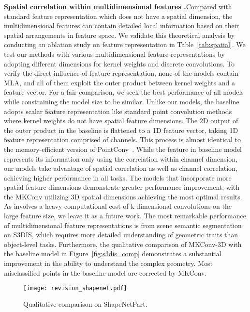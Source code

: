 \documentclass[preprint,12pt]{elsarticle}
\begin{document}
\medskip
\noindent\textbf{Spatial correlation within multidimensional features .}\hspace{0.3cm}Compared with standard feature representation which does not have a spatial dimension, the multidimensional features  can contain detailed local information based on their spatial arrangements in feature space. We validate this theoretical analysis by conducting an ablation study on feature representation in Table~\ref{tab:spatial}. We test our methods with various multidimensional feature representations by adopting different dimensions for kernel weights and discrete convolutions. To verify the direct influence of feature representation, none of the models contain MLA, and all of them exploit the outer product between kernel weights and a feature vector. For a fair comparison, we seek the best performance of all models while constraining the model size to be similar. Unlike our models, the baseline adopts scalar feature representation like standard point convolution methods where kernel weights do not have spatial feature dimensions. The 2D output of the outer product in the baseline is flattened to a 1D feature vector, taking 1D feature representation comprised of channels. This process is almost identical to the memory-efficient version of PointConv~\citep{wu2019pointconv}. While the feature in baseline model represents its information only using the correlation within channel dimension, our models take advantage of spatial correlation as well as channel correlation, achieving higher performance in all tasks. The models that incorporate more spatial feature dimensions demonstrate greater performance improvement, with the MKConv utilizing 3D spatial dimensions achieving the most optimal results. As  involves a heavy computational cost of k-dimensional convolutions on the large feature size, we leave it as a future work. The most remarkable performance of multidimensional feature representations is from scene semantic segmentation on S3DIS, which requires more detailed understanding of geometric traits than object-level tasks. Furthermore, the qualitative comparison of MKConv-3D with the baseline model in Figure~\ref{fig:s3dis_comp} demonstrates a substantial improvement in the ability to understand the complex geometry. Most misclassified points in the baseline model are corrected by MKConv. \begin{figure}[t]
\begin{center}
\texttt{[image: revision\_shapenet.pdf]}
\end{center}
\vspace{-0.7cm}
\caption{Qualitative comparison on ShapeNetPart.
}
\label{fig:shapenetcomp}
\vspace{-0.4cm}
\end{figure}
\end{document}
